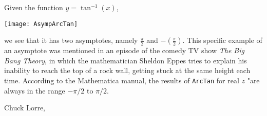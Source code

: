 \documentclass[12pt]{article}
\begin{document}
Given the function $y = \tan^{-1}(x)$,

\begin{center}
\texttt{[image: AsympArcTan]}
\end{center}

we see that it has two asymptotes, namely $\frac{\pi}{2}$ and $-(\frac{\pi}{2})$. This specific example of an asymptote was mentioned in an episode of the comedy TV show {\it The Big Bang Theory}, in which the mathematician Sheldon Eppes tries to explain his inability to reach the top of a rock wall, getting stuck at the same height each time. According to the Mathematica manual, the results of \verb=ArcTan= for real $z$ "are always in the range $- \pi / 2$ to $\pi / 2$. 

\begin{thebibliography}{1}
 Chuck Lorre, 
\end{thebibliography}
\end{document}
